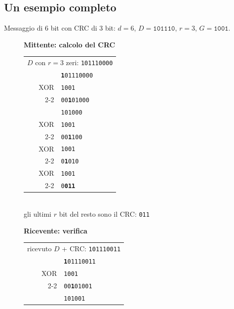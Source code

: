 \subsection{Un esempio completo}

Messaggio di 6 bit con CRC di 3 bit: $d = 6$, $D = \texttt{101110}$, $r = 3$, $G = \texttt{1001}$.

\begin{figure}[H]
\centering
\begin{minipage}{0.47\linewidth}
\centering\textbf{\small Mittente: calcolo del CRC}\\[4pt]
\begin{tabular}{r@{\,}l}
\multicolumn{2}{l}{\small $D$ con $r=3$ zeri: \texttt{101110\textcolor{netred}{000}}} \\[3pt]
& \texttt{\textbf{1}01110000} \\
XOR & \texttt{1001\phantom{00000}} \\ \cline{2-2}
& \texttt{00\textbf{1}01000\phantom{0}}\\[-2pt]
& \texttt{\phantom{00}101000\phantom{0}} \\
XOR & \texttt{\phantom{00}1001\phantom{000}} \\ \cline{2-2}
& \texttt{\phantom{00}00\textbf{1}100\phantom{0}} \\
XOR & \texttt{\phantom{0000}1001\phantom{0}} \\ \cline{2-2}
& \texttt{\phantom{0000}0\textbf{1}010} \\
XOR & \texttt{\phantom{00000}1001} \\ \cline{2-2}
& \texttt{\phantom{00000}0\textcolor{netred}{\textbf{011}}} \\
\end{tabular}\\[4pt]
{\small gli ultimi $r$ bit del resto sono il CRC: \textcolor{netred}{\texttt{011}}}
\end{minipage}\hfill
\begin{minipage}{0.47\linewidth}
\centering\textbf{\small Ricevente: verifica}\\[4pt]
\begin{tabular}{r@{\,}l}
\multicolumn{2}{l}{\small ricevuto $D$ + CRC: \texttt{101110\textcolor{netred}{011}}} \\[3pt]
& \texttt{\textbf{1}01110011} \\
XOR & \texttt{1001\phantom{00000}} \\ \cline{2-2}
& \texttt{00\textbf{1}01001\phantom{0}}\\[-2pt]
& \texttt{\phantom{00}101001\phantom{0}} \\

\end{tabular}
\end{minipage}
\end{figure}
